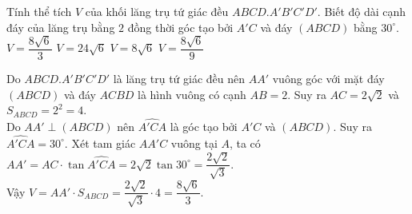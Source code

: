 \begin{ex}%
 Tính thể tích $V$ của khối lăng trụ tứ giác đều $ABCD.A'B'C'D'$. Biết độ dài cạnh đáy của lăng trụ bằng $2$ đồng thời góc tạo bởi $A'C$ và đáy $(ABCD)$ bằng $30^{\circ}$.
 \choice
  {\True $V=\dfrac{8\sqrt{6}}{3}$}
  {$V=24\sqrt{6}$}
  {$V=8\sqrt{6}$}
  {$V=\dfrac{8\sqrt{6}}{9}$}
 \loigiai
  {
  \immini
  {
  Do $ABCD.A'B'C'D'$ là lăng trụ tứ giác đều nên $AA'$ vuông góc với mặt đáy $(ABCD)$ và đáy $ACBD$ là hình vuông có cạnh $AB= 2$. Suy ra $AC=2\sqrt{2}$ và $S_{ABCD}=2^2=4$.\\
  Do $AA' \perp (ABCD)$ nên $\widehat{A'CA}$ là góc tạo bởi $A'C$ và $(ABCD)$. Suy ra $\widehat{A'CA}=30^{\circ}$. Xét tam giác $AA'C$ vuông tại $A$, ta có $AA'=AC \cdot \tan \widehat{A'CA} = 2\sqrt{2}\tan 30^{\circ}=\dfrac{2\sqrt{2}}{\sqrt{3}}$.
\\
  Vậy $V=AA'\cdot S_{ABCD}=\dfrac{2\sqrt{2}}{\sqrt{3}}\cdot 4=\dfrac{8\sqrt{6}}{3}$.
  }
  {
   }
  }
\end{ex}


